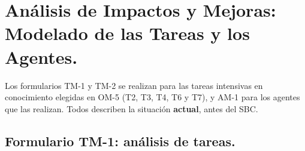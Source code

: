 \documentclass[12pt,a4paper,twoside,spanish]{article}      %
\begin{document}
\section{Análisis de Impactos y Mejoras: Modelado de las Tareas y los Agentes.}

Los formularios TM-1 y TM-2 se realizan para las tareas intensivas en conocimiento elegidas en OM-5 (T2, T3, T4, T6 y T7), y AM-1 para los agentes que las realizan. Todos describen la situación \textbf{actual}, antes del SBC.

\subsection{Formulario TM-1: análisis de tareas.}

\newcommand{\tmuno}[1]{\textbf{Modelo de Tareas} & \textbf{Formulario TM-1: Análisis de Tareas} \\ \hline\hline \textsc{Tarea} & \textbf{#1} \\ \hline}
\end{document}
